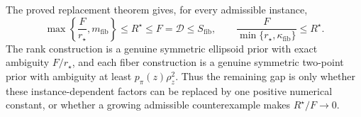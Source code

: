 The proved replacement theorem gives, for every admissible instance,
\[
 \max\left\{\frac{F}{r_{\star}},m_{\mathrm{fib}}\right\}
 \le R^{\star}\le F=\mathcal D\le S_{\mathrm{fib}},
 \qquad
 \frac{F}{\min\{r_{\star},\kappa_{\mathrm{fib}}\}}\le R^{\star}.
\]
The rank construction is a genuine symmetric ellipsoid prior with exact ambiguity \(F/r_{\star}\), and each fiber construction is a genuine symmetric two-point prior with ambiguity at least \(p_{\pi}(z)\rho_z^2\). Thus the remaining gap is only whether these instance-dependent factors can be replaced by one positive numerical constant, or whether a growing admissible counterexample makes \(R^{\star}/F\to0\).